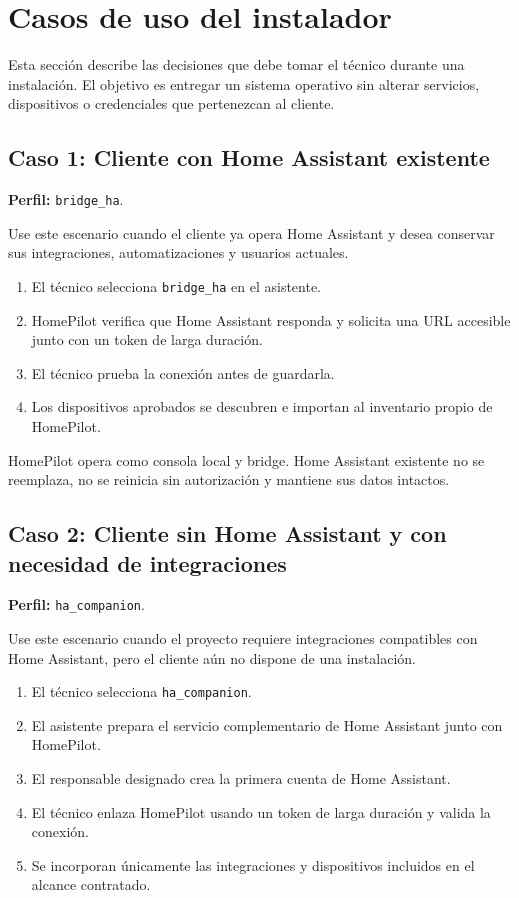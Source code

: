 \section{Casos de uso del instalador}

Esta sección describe las decisiones que debe tomar el técnico durante una instalación. El objetivo es entregar un sistema operativo sin alterar servicios, dispositivos o credenciales que pertenezcan al cliente.

\subsection{Caso 1: Cliente con Home Assistant existente}
\textbf{Perfil:} \texttt{bridge\_ha}.

Use este escenario cuando el cliente ya opera Home Assistant y desea conservar sus integraciones, automatizaciones y usuarios actuales.
\begin{enumerate}[itemsep=0.15cm]
    \item El técnico selecciona \texttt{bridge\_ha} en el asistente.
    \item HomePilot verifica que Home Assistant responda y solicita una URL accesible junto con un token de larga duración.
    \item El técnico prueba la conexión antes de guardarla.
    \item Los dispositivos aprobados se descubren e importan al inventario propio de HomePilot.
\end{enumerate}

\begin{tcolorbox}[title=Resultado esperado]
HomePilot opera como consola local y bridge. Home Assistant existente no se reemplaza, no se reinicia sin autorización y mantiene sus datos intactos.
\end{tcolorbox}

\subsection{Caso 2: Cliente sin Home Assistant y con necesidad de integraciones}
\textbf{Perfil:} \texttt{ha\_companion}.

Use este escenario cuando el proyecto requiere integraciones compatibles con Home Assistant, pero el cliente aún no dispone de una instalación.
\begin{enumerate}[itemsep=0.15cm]
    \item El técnico selecciona \texttt{ha\_companion}.
    \item El asistente prepara el servicio complementario de Home Assistant junto con HomePilot.
    \item El responsable designado crea la primera cuenta de Home Assistant.
    \item El técnico enlaza HomePilot usando un token de larga duración y valida la conexión.
    \item Se incorporan únicamente las integraciones y dispositivos incluidos en el alcance contratado.
\end{enumerate}


